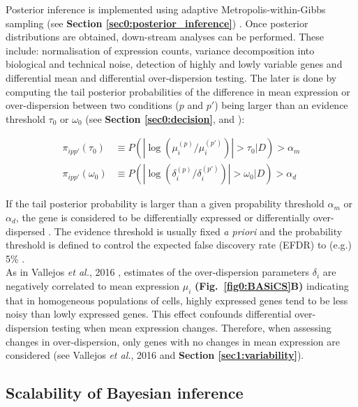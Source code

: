 Posterior inference is implemented using adaptive Metropolis-within-Gibbs sampling (see \textbf{Section \ref{sec0:posterior_inference}}) \citep{Vallejos2015BASiCS, Vallejos2016}. Once posterior distributions are obtained, down-stream analyses can be performed. These include: normalisation of expression counts, variance decomposition into biological and technical noise, detection of highly and lowly variable genes and differential mean and differential over-dispersion testing. The later is done by computing the tail posterior probabilities of the difference in mean expression or over-dispersion between two conditions ($p$ and $p'$) being larger than an evidence threshold $\tau_0$ or $\omega_0$ (see \textbf{Section \ref{sec0:decision}}, and \citep{Bochkina2007, Vallejos2016}):

\begin{align*}
\pi_{ipp'}(\tau_0)&\equiv{}P(|\log(\mu_i^{(p)}/\mu_i^{(p')})|>\tau_0|D)>\alpha_m\\
\pi_{ipp'}(\omega_0)&\equiv{}P(|\log(\delta_i^{(p)}/\delta_i^{(p')})|>\omega_0|D)>\alpha_d
\end{align*}

If the tail posterior probability is larger than a given propability threshold $\alpha_m$ or $\alpha_d$, the gene is considered to be differentially expressed or differentially over-dispersed \citep{Vallejos2016}. The evidence threshold is usually fixed \emph{a priori} and the probability threshold is defined to control the expected false discovery rate (EFDR) to (e.g.) 5\% \cite{Newton2004, Vallejos2016}.\\

As in Vallejos \emph{et al.}, 2016 \citep{Vallejos2016}, estimates of the over-dispersion parameters $\delta_i$ are negatively correlated to mean expression $\mu_i$ \textbf{(Fig.~\ref{fig0:BASiCS}B)} indicating that in homogeneous populations of cells, highly expressed genes tend to be less noisy than lowly expressed genes. This effect confounds differential over-dispersion testing when mean expression changes. Therefore, when assessing changes in over-dispersion, only genes with no changes in mean expression are considered (see Vallejos \emph{et al.}, 2016 \citep{Vallejos2016} and \textbf{Section \ref{sec1:variability}}).  

\subsection{Scalability of Bayesian inference}

